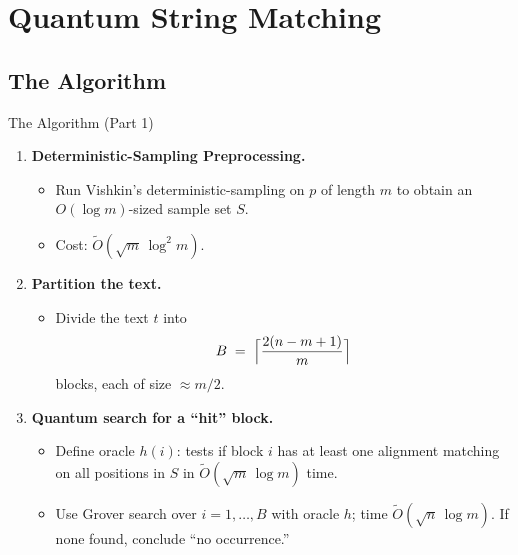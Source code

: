 \documentclass{beamer}
\begin{document}
\section{Quantum String Matching}

\subsection{The Algorithm}
\begin{frame}{The Algorithm (Part 1)}
    \begin{enumerate}
        \item \textbf{Deterministic-Sampling Preprocessing.}
              \begin{itemize}
                  \item Run Vishkin's deterministic-sampling on \(p\) of length \(m\) to obtain an \(O(\log m)\)-sized sample set \(S\).
                  \item Cost: \(\widetilde O(\sqrt{m}\,\log^2 m)\).
              \end{itemize}
        \item \textbf{Partition the text.}
              \begin{itemize}
                  \item Divide the text \(t\) into
                        \[
                            B \;=\; \Bigl\lceil \frac{2(n - m + 1)}{m} \Bigr\rceil
                        \]
                        blocks, each of size \(\approx m/2\).
              \end{itemize}
        \item \textbf{Quantum search for a “hit” block.}
              \begin{itemize}
                  \item Define oracle \(h(i)\): tests if block \(i\) has at least one alignment matching on all positions in \(S\) in \(\widetilde O(\sqrt{m}\,\log m)\) time.
                  \item Use Grover search over \(i=1,\dots,B\) with oracle \(h\); time \(\widetilde O(\sqrt{n}\,\log m)\). If none found, conclude “no occurrence.”
              \end{itemize}
    \end{enumerate}
\end{frame}
\end{document}
